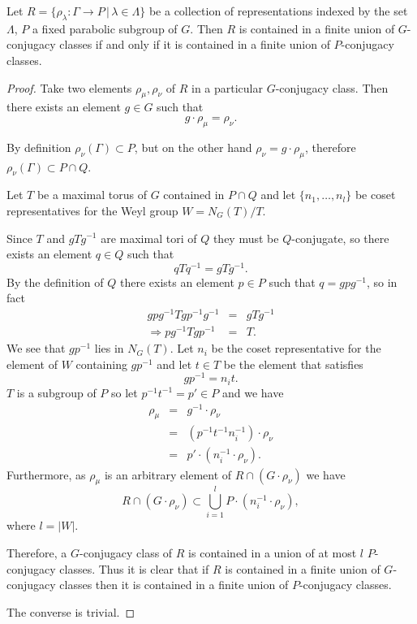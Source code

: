 \begin{lemma} Let $R=\{\rho_\lambda:\Gamma\rightarrow P\, |\, \lambda \in \Lambda\}$ be a collection of representations indexed by the set $\Lambda$, $P$ a fixed parabolic subgroup of $G$. Then $R$ is contained in a finite union of $G$-conjugacy classes if and only if it is contained in a finite union of $P$-conjugacy classes.
  \label{lem:GPconj}
\end{lemma}
\begin{proof}
	Take two elements $\rho_\mu, \rho_\nu$ of $R$ in a particular $G$-conjugacy class. Then there exists an element $g\in G$ such that
	\begin{displaymath}
		g\cdot \rho_\mu = \rho_\nu.
	\end{displaymath}
	
	By definition $\rho_\nu(\Gamma) \subset P$, but on the other hand $\rho_\nu = g\cdot \rho_\mu$, therefore $\rho_\nu(\Gamma) \subset P \cap Q$.
	
	Let $T$ be a maximal torus of $G$ contained in $P\cap Q$ and let $\{n_1, \ldots, n_l\}$ be coset representatives for the Weyl group $W = N_G(T)/T$.
	
	Since $T$ and $gTg^{-1}$ are maximal tori of $Q$ they must be $Q$-conjugate, so there exists an element $q\in Q$ such that
	\begin{displaymath}
		qTq^{-1} = gTg^{-1}.
	\end{displaymath}
	By the definition of $Q$ there exists an element $p\in P$ such that $q = gpg^{-1}$, so in fact
	\begin{eqnarray*}
		gpg^{-1}Tgp^{-1}g^{-1} &=& gTg^{-1} \\
		\Rightarrow pg^{-1}Tgp^{-1} &=& T.
	\end{eqnarray*}
	We see that $gp^{-1}$ lies in $N_G(T)$. Let $n_i$ be the coset representative for the element of $W$ containing $gp^{-1}$ and let $t\in T$ be the element that satisfies
	\begin{displaymath}
		gp^{-1} = n_it.
	\end{displaymath}
	$T$ is a subgroup of $P$ so let $p^{-1}t^{-1} = p' \in P$ and we have
	\begin{eqnarray*}
		\rho_\mu &=& g^{-1}\cdot\rho_\nu\\
		&=& (p^{-1}t^{-1}n_i^{-1})\cdot\rho_\nu\\
		&=& p'\cdot(n_i^{-1}\cdot\rho_\nu). 
	\end{eqnarray*}
	Furthermore, as $\rho_\mu$ is an arbitrary element of $R\cap \left(G\cdot \rho_\nu\right)$ we have
	\begin{displaymath}
		R \cap \left(G\cdot \rho_\nu\right) \subset \bigcup_{i=1}^l P\cdot(n_i^{-1}\cdot\rho_\nu),
	\end{displaymath}
	where $l = |W|$.
	
	Therefore, a $G$-conjugacy class of $R$ is contained in a union of at most $l$ $P$-conjugacy classes. Thus it is clear that if $R$ is contained in a finite union of $G$-conjugacy classes then it is contained in a finite union of $P$-conjugacy classes.
	
	The converse is trivial.
\end{proof}

